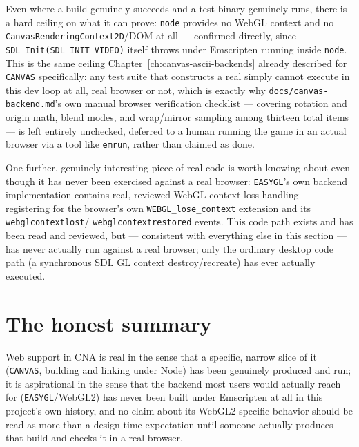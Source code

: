 Even where a build genuinely succeeds and a test binary genuinely runs, there is a hard
ceiling on what it can prove: \texttt{node} provides no WebGL context and no
\texttt{CanvasRenderingContext2D}/DOM at all --- confirmed directly, since
\texttt{SDL\_Init(SDL\_INIT\_VIDEO)} itself throws under Emscripten running inside
\texttt{node}. This is the same ceiling Chapter~\ref{ch:canvas-ascii-backends} already
described for \texttt{CANVAS} specifically: any test suite that constructs a real
 simply cannot execute in this dev loop at all, real browser or not,
which is exactly why \texttt{docs/canvas-backend.md}'s own manual browser verification
checklist --- covering rotation and origin math, blend modes, and wrap/mirror sampling among
thirteen total items --- is left entirely unchecked, deferred to a human running the game in
an actual browser via a tool like \texttt{emrun}, rather than claimed as done.

One further, genuinely interesting piece of real code is worth knowing about even though it
has never been exercised against a real browser: \texttt{EASYGL}'s own backend implementation
contains real, reviewed WebGL-context-loss handling --- registering for the browser's own
\texttt{WEBGL\_lose\_context} extension and its \texttt{webglcontextlost}/%
\texttt{webglcontextrestored} events. This code path exists and has been read and reviewed,
but --- consistent with everything else in this section --- has never actually run against a
real browser; only the ordinary desktop code path (a synchronous SDL GL context
destroy/recreate) has ever actually executed.

\section{The honest summary}

Web support in CNA is real in the sense that a specific, narrow slice of it (\texttt{CANVAS},
building and linking under Node) has been genuinely produced and run; it is aspirational in
the sense that the backend most users would actually reach for (\texttt{EASYGL}/WebGL2) has
never been built under Emscripten at all in this project's own history, and no claim about
its WebGL2-specific behavior should be read as more than a design-time expectation until
someone actually produces that build and checks it in a real browser.
